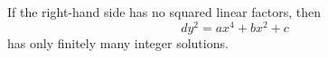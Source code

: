 \begin{proposition}
    If the right-hand side has no squared linear factors, then
\[
    dy^2=ax^4+bx^2+c
\]
    has only finitely many integer solutions.
\end{proposition}
